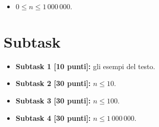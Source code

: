 


\begin{itemize}[nolistsep, noitemsep]
  \item $0 \le n \le 1\,000\,000$.
\end{itemize}

  \section*{Subtask}
  \begin{itemize}
    \item \textbf{Subtask 1 [10 punti]:} gli esempi del testo.
    \item \textbf{Subtask 2 [30 punti]:} $n \leq 10$.
    \item \textbf{Subtask 3 [30 punti]:} $n \leq 100$.
    \item \textbf{Subtask 4 [30 punti]:} $n \leq 1\,000\,000$.
  \end{itemize}
  
